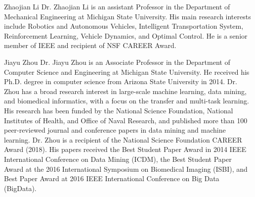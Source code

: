 \documentclass[journal]{IEEEtran}
\begin{document}
\begin{IEEEbiography}{Zhaojian Li}
Dr. Zhaojian Li is an assistant Professor in the Department of Mechanical Engineering at Michigan State University. His main research interests include Robotics and Autonomous Vehicles, Intelligent Transportation System, Reinforcement Learning, Vehicle Dynamics, and Optimal Control. He is a senior member of IEEE and recipient of NSF CAREER Award.
\end{IEEEbiography}

\begin{IEEEbiography}{Jiayu Zhou}
Dr. Jiayu Zhou is an Associate Professor in the Department of Computer Science and Engineering at Michigan State University. He received his Ph.D. degree in computer science from Arizona State University in 2014. Dr. Zhou has a broad research interest in large-scale machine learning, data mining, and biomedical informatics, with a focus on the transfer and multi-task learning. His research has been funded by the National Science Foundation, National Institutes of Health, and Office of Naval Research, and published more than 100 peer-reviewed journal and conference papers in data mining and machine learning. Dr. Zhou is a recipient of the National Science Foundation CAREER Award (2018). His papers received the Best Student Paper Award in 2014 IEEE International Conference on Data Mining (ICDM), the Best Student Paper Award at the 2016 International Symposium on Biomedical Imaging (ISBI), and Best Paper Award at 2016 IEEE International Conference on Big Data (BigData).
\end{IEEEbiography}
\end{document}
